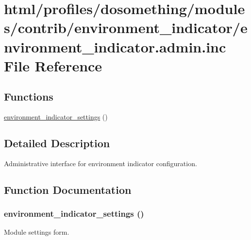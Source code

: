 \hypertarget{environment__indicator_8admin_8inc}{
\section{html/profiles/dosomething/modules/contrib/environment\_\-indicator/environment\_\-indicator.admin.inc File Reference}
\label{environment__indicator_8admin_8inc}
}
\subsection*{Functions}
\begin{DoxyCompactItemize}
\item 
\hyperlink{environment__indicator_8admin_8inc_aa48c19bcf69472fa09d68cf1b7974642}{environment\_\-indicator\_\-settings} ()
\end{DoxyCompactItemize}


\subsection{Detailed Description}
Administrative interface for environment indicator configuration. 

\subsection{Function Documentation}
\hypertarget{environment__indicator_8admin_8inc_aa48c19bcf69472fa09d68cf1b7974642}{
\subsubsection[{environment\_\-indicator\_\-settings}]{\setlength{\rightskip}{0pt plus 5cm}environment\_\-indicator\_\-settings ()}}
\label{environment__indicator_8admin_8inc_aa48c19bcf69472fa09d68cf1b7974642}
Module settings form. 